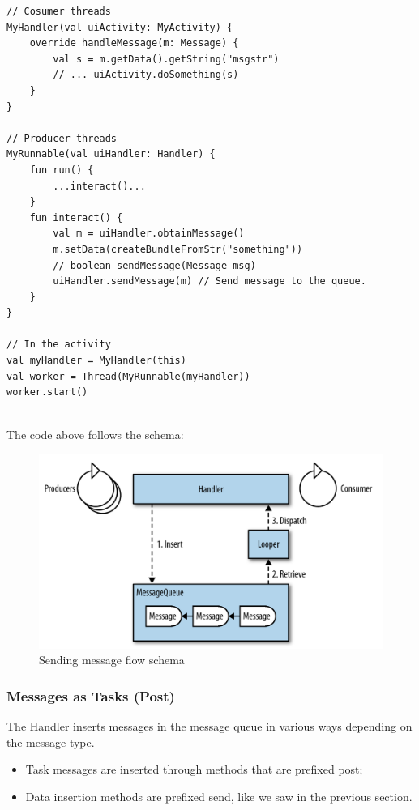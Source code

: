 \begin{lstlisting}[title=Send messages between threads]
// Cosumer threads 
MyHandler(val uiActivity: MyActivity) { 
    override handleMessage(m: Message) { 
        val s = m.getData().getString("msgstr") 
        // ... uiActivity.doSomething(s) 
    } 
}

// Producer threads
MyRunnable(val uiHandler: Handler) { 
    fun run() { 
        ...interact()...
    } 
    fun interact() { 
        val m = uiHandler.obtainMessage() 
        m.setData(createBundleFromStr("something")) 
        // boolean sendMessage(Message msg)
        uiHandler.sendMessage(m) // Send message to the queue. 
    } 
}
    
// In the activity
val myHandler = MyHandler(this)
val worker = Thread(MyRunnable(myHandler))
worker.start()
    
\end{lstlisting}

The code above follows the schema:
\begin{figure}[h]
\centering
\includegraphics[width=0.8\linewidth]{figures/05_handler_schema.png}
\caption{Sending message flow schema}
\label{fig:handler_schema}
\end{figure}


\newpage
\subsubsection{Messages as Tasks (Post)}
The Handler inserts messages in the message queue in various ways depending on the 
message type. 
\begin{itemize}
    \item Task messages are inserted through methods that are prefixed post;
    \item Data insertion methods are prefixed send, like we saw in the previous section. 
\end{itemize}

